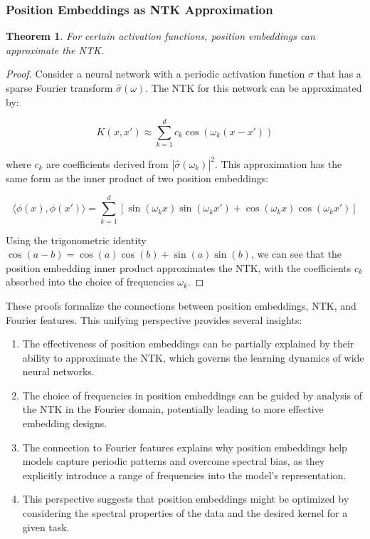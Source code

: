 \documentclass{article}
\newtheorem{theorem}{Theorem}
\begin{document}
\subsubsection{Position Embeddings as NTK Approximation}

\begin{theorem}
For certain activation functions, position embeddings can approximate the NTK.
\end{theorem}

\begin{proof}
Consider a neural network with a periodic activation function $\sigma$ that has a sparse Fourier transform $\hat{\sigma}(\omega)$. The NTK for this network can be approximated by:

\begin{equation}
    K(x, x') \approx \sum_{k=1}^d c_k \cos(\omega_k(x-x'))
\end{equation}

where $c_k$ are coefficients derived from $|\hat{\sigma}(\omega_k)|^2$. This approximation has the same form as the inner product of two position embeddings:

\begin{equation}
    \langle \phi(x), \phi(x') \rangle = \sum_{k=1}^d [\sin(\omega_k x)\sin(\omega_k x') + \cos(\omega_k x)\cos(\omega_k x')]
\end{equation}

Using the trigonometric identity $\cos(a-b) = \cos(a)\cos(b) + \sin(a)\sin(b)$, we can see that the position embedding inner product approximates the NTK, with the coefficients $c_k$ absorbed into the choice of frequencies $\omega_k$.
\end{proof}

These proofs formalize the connections between position embeddings, NTK, and Fourier features. This unifying perspective provides several insights:

\begin{enumerate}
    \item The effectiveness of position embeddings can be partially explained by their ability to approximate the NTK, which governs the learning dynamics of wide neural networks.
    \item The choice of frequencies in position embeddings can be guided by analysis of the NTK in the Fourier domain, potentially leading to more effective embedding designs.
    \item The connection to Fourier features explains why position embeddings help models capture periodic patterns and overcome spectral bias, as they explicitly introduce a range of frequencies into the model's representation.
    \item This perspective suggests that position embeddings might be optimized by considering the spectral properties of the data and the desired kernel for a given task.
\end{enumerate}
\end{document}
